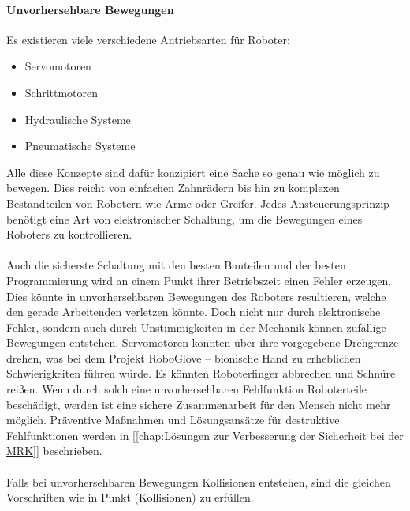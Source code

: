 \documentclass[titlepage,12pt,twoside]{article}
\begin{document}
\paragraph{Unvorhersehbare Bewegungen}
\hfill \break
\hfill \break
Es existieren viele verschiedene Antriebsarten für Roboter: \\
\begin{itemize}
	\item Servomotoren
	\item Schrittmotoren
	\item Hydraulische Systeme
	\item Pneumatische Systeme
\end{itemize}
\hfill \break
Alle diese Konzepte sind dafür konzipiert eine Sache so genau wie möglich zu 
bewegen. Dies reicht von einfachen Zahnrädern bis hin zu komplexen Bestandteilen 
von Robotern wie Arme oder Greifer. Jedes Ansteuerungsprinzip benötigt eine Art 
von elektronischer Schaltung, um die Bewegungen eines Roboters zu kontrollieren. \\
\\
Auch die sicherste Schaltung mit den besten Bauteilen und der besten Programmierung 
wird an einem Punkt ihrer Betriebszeit einen Fehler erzeugen. Dies könnte in 
unvorhersehbaren Bewegungen des Roboters resultieren, welche den gerade Arbeitenden 
verletzen könnte. Doch nicht nur durch elektronische Fehler, sondern auch durch 
Unstimmigkeiten in der Mechanik können zufällige Bewegungen entstehen. Servomotoren 
könnten über ihre vorgegebene Drehgrenze drehen, was bei dem Projekt RoboGlove – 
bionische Hand zu erheblichen Schwierigkeiten führen würde. Es könnten Roboterfinger 
abbrechen und Schnüre reißen. Wenn durch solch eine unvorhersehbaren Fehlfunktion 
Roboterteile beschädigt, werden ist eine sichere Zusammenarbeit für den Mensch 
nicht mehr möglich. Präventive Maßnahmen und Lösungsansätze für destruktive 
Fehlfunktionen werden in [\textcolor{blue}{\autoref{chap:Lösungen zur Verbesserung der Sicherheit bei der MRK}}]
beschrieben. \\
\\
Falls bei unvorhersehbaren Bewegungen Kollisionen entstehen, sind die gleichen 
Vorschriften wie in Punkt (Kollisionen) zu erfüllen. \\
\end{document}
